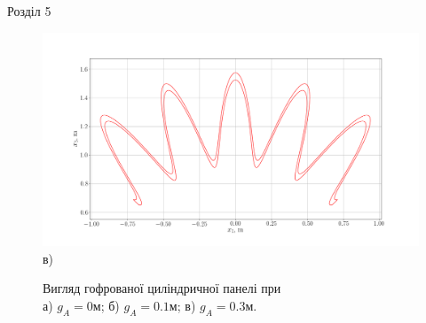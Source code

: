 \documentclass[8pt]{beamer}
\numberwithin{figure}{section}
\numberwithin{equation}{section}
\numberwithin{table}{section}
\begin{document}
\begin{frame}{Розділ 5}

\begin{figure}[h]
\begin{minipage}[h]{0.49\linewidth}
\end{minipage}
\hfill
\begin{minipage}[h]{0.49\linewidth}
\end{minipage}
\includegraphics[width=0.49\linewidth]{pic/cor_geom_ga03.png} \\ в)
\caption{Вигляд гофрованої циліндричної панелі при \\а) $g_A = 0м$; б) $g_A = 0.1м$; в) $g_A = 0.3м$.}
\end{figure}

\end{frame}
\end{document}
